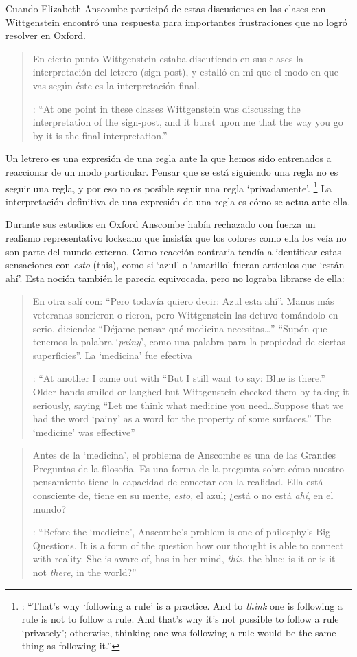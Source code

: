 Cuando Elizabeth Anscombe participó de estas discusiones en las clases con Wittgenstein encontró una respuesta para importantes frustraciones que no logró resolver en Oxford. \blockquote[{\cite[viii]{anscombe1981metaphysics}}: \enquote{At one point in these classes Wittgenstein was discussing the interpretation of the sign-post, and it burst upon me that the way you go by it is the final interpretation.}]{En cierto punto Wittgenstein estaba discutiendo en sus clases la interpretación del letrero (sign-post), y estalló en mi que el modo en que vas según éste es la interpretación final.} Un letrero es una expresión de una regla ante la que hemos sido entrenados a reaccionar de un modo particular. Pensar que se está siguiendo una regla no es seguir una regla, y por eso no es posible seguir una regla `privadamente'. \footnote{\cite[Cf.~][\S202]{wittgenstein1953phiinv}: \enquote{That's why `following a rule' is a practice. And to \emph{think} one is following a rule is not to follow a rule. And that's why it's not possible to follow a rule `privately'; otherwise, thinking one was following a rule would be the same thing as following it.}} La interpretación definitiva de una expresión de una regla es cómo se actua ante ella.

Durante sus estudios en Oxford Anscombe había rechazado con fuerza un realismo representativo lockeano que insistía que los colores como ella los veía no son parte del mundo externo. Como reacción contraria tendía a identificar estas sensaciones con \emph{esto} (this), como si `azul' o `amarillo' fueran artículos que `están ahí'. Esta noción también le parecía equivocada, pero no lograba librarse de ella: \blockquote[{\cite[viii]{anscombe1981metaphysics}}: \enquote{At another  I came out with ``But I still want to say: Blue is there.'' Older hands smiled or laughed but Wittgenstein checked them by taking it seriously, saying ``Let me think what medicine you need\ldots Suppose that we had the word `painy' as a word for the property of some surfaces.'' The `medicine' was effective}]{En otra  salí con: ``Pero todavía quiero decir: Azul esta ahí''. Manos más veteranas sonrieron o rieron, pero Wittgenstein las detuvo tomándolo en serio, diciendo: ``Déjame pensar qué medicina necesitas\ldots'' ``Supón que tenemos la palabra `\emph{painy}', como una palabra para la propiedad de ciertas superficies''. La `medicina' fue efectiva}

\blockquote[{\cite[Cf.~][213]{diamond2004crisscross}}: \enquote{Before the `medicine', Anscombe's problem is one of philosphy's Big Questions. It is a form of the question how our thought is able to connect with reality. She is aware of, has in her mind, \emph{this}, the blue; is it or is it not \emph{there}, in the world?}]{Antes de la `medicina', el problema de Anscombe es una de las Grandes Preguntas de la filosofía. Es una forma de la pregunta sobre cómo nuestro pensamiento tiene la capacidad de conectar con la realidad. Ella está consciente de, tiene en su mente, \emph{esto}, el azul; ¿está o no está \emph{ahí}, en el mundo?}

